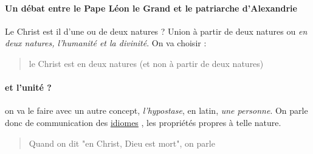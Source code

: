    \paragraph{Un débat entre le Pape Léon le Grand et le patriarche d'Alexandrie} Le Christ est il d'une ou de deux natures ? Union à partir de deux natures ou \textit{en deux natures, l'humanité et la divinité}. On va choisir : 
   \begin{quote}
       le Christ est en deux natures (et non à partir de deux natures)
   \end{quote}
   
   \paragraph{et l'unité ?} on va le faire avec un autre concept, \textit{l'hypostase}, en latin, \textit{une personne}. On parle donc de communication des \href{https://fr.wikipedia.org/wiki/Communicatio_idiomatum}{idiomes} , les propriétés propres à telle nature. 
   \begin{quote}
       Quand on dit "en Christ, Dieu est mort", on parle
   \end{quote}
    
    
  
 






